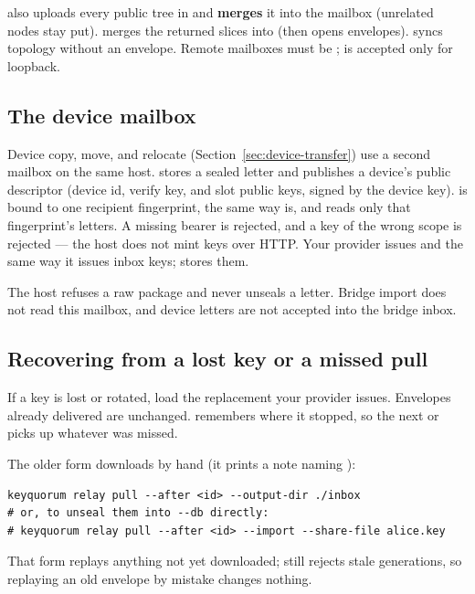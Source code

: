  also uploads every public tree in  and
\textbf{merges} it into the mailbox (unrelated nodes stay put).  merges the returned slices into  (then 
opens envelopes).  syncs topology without an envelope.
Remote mailboxes must be ;  is accepted only
for loopback.

\subsection{The device mailbox}

Device copy, move, and relocate (Section~\ref{sec:device-transfer}) use a
second mailbox on the same host.  stores a sealed letter
and publishes a device's public descriptor (device id, verify key, and slot
public keys, signed by the device key).  is bound to one
recipient fingerprint, the same way  is, and reads only
that fingerprint's letters. A missing bearer is rejected, and a key of the
wrong scope is rejected --- the host does not mint keys over HTTP. Your
provider issues  and  the same way it
issues inbox keys;  stores them.

The host refuses a raw  package and never unseals a letter.
Bridge import does not read this mailbox, and device letters are not
accepted into the bridge inbox.

\subsection{Recovering from a lost key or a missed pull}

If a key is lost or rotated, load the replacement your provider issues.
Envelopes already delivered are unchanged.  remembers where it
stopped, so the next  or  picks up whatever was
missed.

The older form downloads by hand (it prints a note naming ):

\begin{lstlisting}
keyquorum relay pull --after <id> --output-dir ./inbox
# or, to unseal them into --db directly:
# keyquorum relay pull --after <id> --import --share-file alice.key
\end{lstlisting}

That form replays anything not yet downloaded;  still
rejects stale generations, so replaying an old envelope by mistake changes
nothing.
